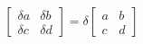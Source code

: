\documentclass[preview]{standalone}
\begin{document}
\begin{align*}
\begin{bmatrix} \delta a & \delta b \\ \delta c & \delta d \end{bmatrix} = \delta \begin{bmatrix} a & b \\ c & d \end{bmatrix}
\end{align*}
\end{document}
